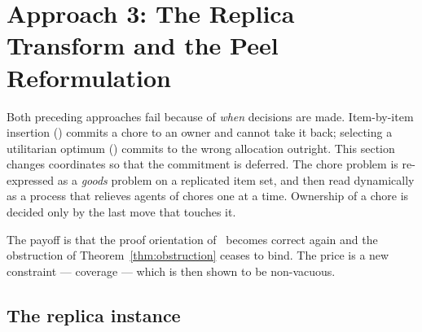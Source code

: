 \section{Approach 3: The Replica Transform and the Peel Reformulation}
\label{sec:approach3}

Both preceding approaches fail because of \emph{when} decisions are made.
Item-by-item insertion () commits a chore to an owner and
cannot take it back; selecting a utilitarian optimum ()
commits to the wrong allocation outright. This section changes coordinates so
that the commitment is deferred. The chore problem is re-expressed as a
\emph{goods} problem on a replicated item set, and then read dynamically as a
process that relieves agents of chores one at a time. Ownership of a chore is
decided only by the last move that touches it.

The payoff is that the proof orientation of~\cite{BKNS22} becomes correct again
and the obstruction of Theorem~\ref{thm:obstruction} ceases to bind. The price
is a new constraint --- coverage --- which is then shown to be non-vacuous.

\subsection{The replica instance}
\label{sec:replica}

